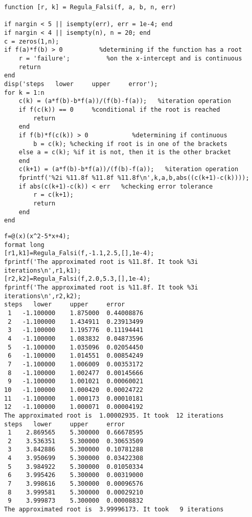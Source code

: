 \documentclass[12pt]{article}
\begin{document}
\begin{lstlisting}[style=Matlab-editor]
function [r, k] = Regula_Falsi(f, a, b, n, err)

if nargin < 5 || isempty(err), err = 1e-4; end
if nargin < 4 || isempty(n), n = 20; end
c = zeros(1,n);
if f(a)*f(b) > 0          %determining if the function has a root
    r = 'failure';          %on the x-intercept and is continuous
    return
end
disp('steps   lower     upper     error');
for k = 1:n
    c(k) = (a*f(b)-b*f(a))/(f(b)-f(a));   %iteration operation
    if f(c(k)) == 0     %conditional if the root is reached
        return
    end
    if f(b)*f(c(k)) > 0            %determining if continuous
        b = c(k); %checking if root is in one of the brackets
    else a = c(k); %if it is not, then it is the other bracket
    end
    c(k+1) = (a*f(b)-b*f(a))/(f(b)-f(a));   %iteration operation
    fprintf('%2i %11.8f %11.8f %11.8f\n',k,a,b,abs((c(k+1)-c(k))));
    if abs(c(k+1)-c(k)) < err   %checking error tolerance
        r = c(k+1);
        return
    end
end

\end{lstlisting}


\begin{lstlisting}[style=Matlab-editor]
f=@(x)(x^2-5*x+4);
format long
[r1,k1]=Regula_Falsi(f,-1.1,2.5,[],1e-4);
fprintf('The approximated root is %11.8f. It took %3i iterations\n',r1,k1);
[r2,k2]=Regula_Falsi(f,2.0,5.3,[],1e-4);
fprintf('The approximated root is %11.8f. It took %3i iterations\n',r2,k2);
steps   lower     upper     error
 1   -1.100000    1.875000  0.44008876
 2   -1.100000    1.434911  0.23913499
 3   -1.100000    1.195776  0.11194441
 4   -1.100000    1.083832  0.04873596
 5   -1.100000    1.035096  0.02054450
 6   -1.100000    1.014551  0.00854249
 7   -1.100000    1.006009  0.00353172
 8   -1.100000    1.002477  0.00145666
 9   -1.100000    1.001021  0.00060021
10   -1.100000    1.000420  0.00024722
11   -1.100000    1.000173  0.00010181
12   -1.100000    1.000071  0.00004192
The approximated root is  1.00002935. It took  12 iterations
steps   lower     upper     error
 1    2.869565    5.300000  0.66678595
 2    3.536351    5.300000  0.30653509
 3    3.842886    5.300000  0.10781288
 4    3.950699    5.300000  0.03422308
 5    3.984922    5.300000  0.01050334
 6    3.995426    5.300000  0.00319000
 7    3.998616    5.300000  0.00096576
 8    3.999581    5.300000  0.00029210
 9    3.999873    5.300000  0.00008832
The approximated root is  3.99996173. It took   9 iterations

\end{lstlisting}
\pagebreak
\end{document}
